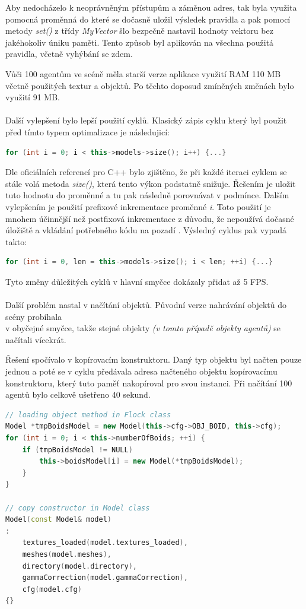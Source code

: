 \documentclass[czech,public,dept460,male,cpdeclaration]{diploma}
\begin{document}
Aby nedocházelo k neoprávněným přístupům a záměnou adres, tak byla využita pomocná proměnná do které se dočasně uložil výsledek pravidla a pak pomocí metody \textit{set()} z třídy \textit{MyVector} šlo bezpečně nastavil hodnoty vektoru bez jakéhokoliv úniku paměti. Tento způsob byl aplikován na všechna použitá pravidla, včetně vyhýbání se zdem.

Vůči 100 agentům ve scéně měla starší verze aplikace využití RAM 110 MB včetně použitých textur a objektů. Po těchto doposud zmíněných změnách bylo využití 91 MB.
\\\\
Další vylepšení bylo lepší použití cyklů. Klasický zápis cyklu který byl použit před tímto typem optimalizace je následujicí:
\begin{lstlisting}[language=c++,label=src:classic cycle,caption=Použití klasického cyklu] 
for (int i = 0; i < this->models->size(); i++) {...}
\end{lstlisting}
Dle oficiálních referencí pro C++ \cite{linkToCppReference} bylo zjištěno, že při každé iteraci cyklem se stále volá metoda \textit{size()}, která tento výkon podstatně snižuje. Řešením je uložit tuto hodnotu do proměnné a tu pak  následně porovnávat v podmínce. Dalším vylepšením je použití prefixové inkrementace proměnné \textit{i}. Toto použití je mnohem účinnější než postfixová inkrementace z důvodu, že nepoužívá dočasné úložiště a vkládání potřebného kódu na pozadí \cite{linkToPreIncrementation}. Výsledný cyklus pak vypadá takto:
\begin{lstlisting}[language=c++,label=src:optimalized cycle,caption=Použití optimalizovaného cyklu] 
for (int i = 0, len = this->models->size(); i < len; ++i) {...}
\end{lstlisting}

Tyto změny důležitých cyklů v hlavní smyčce dokázaly přidat až 5 FPS.
\\\\
Další problém nastal v načítání objektů. Původní verze nahrávání objektů do scény probíhala\\ v obyčejné smyčce, takže stejné objekty \textit{(v tomto případě objekty agentů)} se načítali vícekrát. 

Řešení spočívalo v kopírovacím konstruktoru. Daný typ objektu byl načten pouze jednou a poté se v cyklu předávala adresa načteného objektu kopírovacímu konstruktoru, který tuto paměť nakopíroval pro svou instanci. Při načítání 100 agentů bylo celkově ušetřeno 40 sekund.

\begin{lstlisting}[language=c++,label=src:copy constructor,caption=Ukázka použití kopírovacího konstruktoru]
// loading object method in Flock class
Model *tmpBoidsModel = new Model(this->cfg->OBJ_BOID, this->cfg);
for (int i = 0; i < this->numberOfBoids; ++i) {
	if (tmpBoidsModel != NULL)
		this->boidsModel[i] = new Model(*tmpBoidsModel);
	}
}

// copy constructor in Model class
Model(const Model& model) 
: 
	textures_loaded(model.textures_loaded),
	meshes(model.meshes),
	directory(model.directory),
	gammaCorrection(model.gammaCorrection),
	cfg(model.cfg)
{}
\end{lstlisting}
\end{document}
